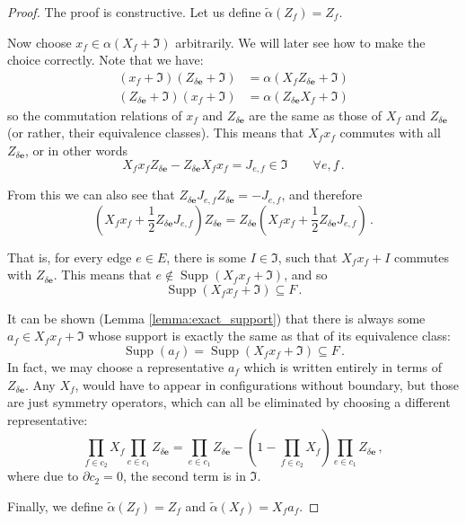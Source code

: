 \documentclass[aps,twocolumn,prx,floatfix,preprintnumbers, nofootinbib,10pt]{revtex4-2}
\numberwithin{equation}{section}
\theoremstyle{definition}
\theoremstyle{remark}
\theoremstyle{claim}
\newcommand{\be}{\begin{equation}}
\newcommand{\ee}{\end{equation}}
\newcommand{\paren}[1]{\left( #1 \right)}
\begin{document}
\begin{proof}
 The proof is constructive. Let us define $\tilde{\alpha}(Z_f) = Z_f$.

 Now choose $x_f \in \alpha(X_f + \mathfrak{I})$ arbitrarily. We will later see how to make the choice correctly. Note that we have:
 \begin{align}
 (x_f + \mathfrak{I}) (Z_{\delta \bm{e}} + \mathfrak{I}) &= \alpha(X_f Z_{\delta \bm{e}} + \mathfrak{I}) \nonumber \\
 (Z_{\delta \bm{e}} + \mathfrak{I}) (x_f + \mathfrak{I}) &= \alpha(Z_{\delta \bm{e}} X_f + \mathfrak{I})
 \end{align}
 so the commutation relations of $x_f$ and $Z_{\delta \bm{e}}$ are the same as those of $X_f$ and $Z_{\delta \bm{e}}$ (or rather, their equivalence classes). This means that $X_f x_f$ commutes with all $Z_{\delta \bm{e}}$, or in other words
 \be
 X_f x_f Z_{\delta \bm{e}} - Z_{\delta \bm{e}} X_f x_f = J_{e, f} \in \mathfrak{I} \qquad \forall e, f \,.
 \ee

 From this we can also see that $Z_{\delta \bm{e}} J_{e, f} Z_{\delta \bm{e}} = - J_{e, f}$, and therefore
 \be
 \paren{X_f x_f + \frac{1}{2} Z_{\delta \bm{e}} J_{e, f}} Z_{\delta \bm{e}} = Z_{\delta \bm{e}} \paren{X_f x_f + \frac{1}{2} Z_{\delta \bm{e}} J_{e, f}} \,.
 \ee

 That is, for every edge $e \in E$, there is some $I \in \mathfrak{I}$, such that $X_f x_f + I$ commutes with $Z_{\delta \bm{e}}$. This means that $e \notin \operatorname{Supp}(X_f x_f + \mathfrak{I})$, and so
 \be
 \operatorname{Supp}(X_f x_f + \mathfrak{I}) \subseteq F \,.
 \ee

 It can be shown (Lemma \ref{lemma:exact_support}) that there is always some $a_f \in X_f x_f + \mathfrak{I}$ whose support is exactly the same as that of its equivalence class:
 \be
 \operatorname{Supp}(a_f) = \operatorname{Supp}(X_f x_f + \mathfrak{I}) \subseteq F \,.
 \ee
 In fact, we may choose a representative $a_f$ which is written entirely in terms of $Z_{\delta \bm{e}}$. Any $X_f$, would have to appear in configurations without boundary, but those are just symmetry operators, which can all be eliminated by choosing a different representative:
 \be
 \prod_{f \in c_2} X_f \prod_{e \in c_1} Z_{\delta \bm{e}} = \prod_{e \in c_1} Z_{\delta \bm{e}} - \paren{1 - \prod_{f \in c_2} X_f} \prod_{e \in c_1} Z_{\delta \bm{e}} \,,
 \ee
 where due to $\partial c_2 = 0$, the second term is in $\mathfrak{I}$.

 Finally, we define $\tilde{\alpha}(Z_f) = Z_f$ and $\tilde{\alpha}(X_f) = X_f a_f$.


\end{proof}
\end{document}
